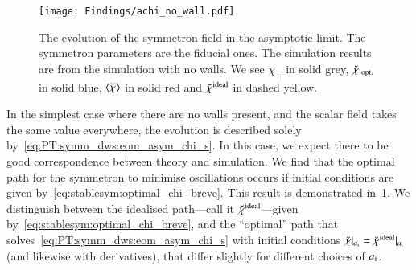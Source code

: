 

\newcommand{\brchi}{\breve{\chi}}



\begin{figure}[h]
    \centering
    \texttt{[image: Findings/achi\_no\_wall.pdf]}
    \caption{The evolution of the symmetron field in the asymptotic limit. The symmetron parameters are the fiducial ones. The simulation results are from the simulation with no walls. We see $\chi_+$ in solid grey, $\brchi\rvert\ped{opt.}$ in solid blue, $\avg{\brchi}$ in solid red and $\brchi\ap{ideal}$ in dashed yellow.}
    \label{fig:results:achi:achi_no_wall}
\end{figure}
In the simplest case where there are no walls present, and the scalar field takes the same value everywhere, the evolution is described solely by~\cref{eq:PT:symm_dws:eom_asym_chi_s}. In this case, we expect there to be good correspondence between theory and simulation. We find that the optimal path for the symmetron to minimise oscillations occurs if initial conditions are given by~\cref{eq:stablesym:optimal_chi_breve}. This result is demonstrated in~\cref{fig:results:achi:achi_no_wall}. 
We distinguish between the idealised path---call it $\brchi\ap{ideal}$---given by~\cref{eq:stablesym:optimal_chi_breve}, and the ``optimal'' path that solves~\cref{eq:PT:symm_dws:eom_asym_chi_s} with initial conditions $\brchi\rvert_{a\ped{i}} = \brchi\ap{ideal}\rvert_{a\ped{i}}$ (and likewise with derivatives), that differ slightly for different choices of $a_\mathrm{i}$. 




